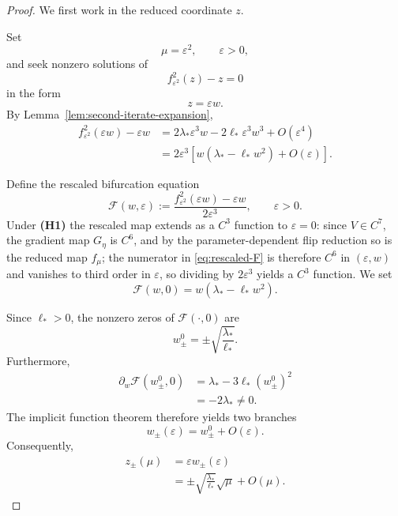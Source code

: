 \begin{proof}
We first work in the reduced coordinate $z$.

Set
\[
\mu=\varepsilon^2,
\qquad
\varepsilon>0,
\]
and seek nonzero solutions of
\[
f_{\varepsilon^2}^2(z)-z=0
\]
in the form
\[
z=\varepsilon w.
\]
By Lemma~\ref{lem:second-iterate-expansion},
\begin{align}
f_{\varepsilon^2}^2(\varepsilon w)-\varepsilon w
&=
2\lambda_*\varepsilon^3w
-
2\ell_*\varepsilon^3w^3
+
O(\varepsilon^4)
\nonumber\\
&=
2\varepsilon^3
\left[
w(\lambda_*-\ell_*w^2)
+
O(\varepsilon)
\right].
\label{eq:scaled-second-iterate}
\end{align}

Define the rescaled bifurcation equation
\begin{equation}
\mathscr F(w,\varepsilon)
:=
\frac{
f_{\varepsilon^2}^2(\varepsilon w)-\varepsilon w
}{
2\varepsilon^3
},
\qquad
\varepsilon>0.
\label{eq:rescaled-F}
\end{equation}
Under \textbf{(H1)} the rescaled map extends as a $C^3$ function to
$\varepsilon=0$: since $V\in C^7$, the gradient map $G_\eta$ is
$C^6$, and by the parameter-dependent flip reduction so is the
reduced map $f_\mu$; the numerator in \eqref{eq:rescaled-F} is
therefore $C^6$ in $(\varepsilon,w)$ and vanishes to third order in
$\varepsilon$, so dividing by $2\varepsilon^3$ yields a $C^3$
function.  We set
\begin{equation}
\mathscr F(w,0)
=
w(\lambda_*-\ell_*w^2).
\label{eq:rescaled-limit}
\end{equation}

Since $\ell_*>0$, the nonzero zeros of
$\mathscr F(\cdot,0)$ are
\begin{equation}
w_\pm^0
=
\pm
\sqrt{\frac{\lambda_*}{\ell_*}}.
\label{eq:w0}
\end{equation}
Furthermore,
\begin{align}
\partial_w\mathscr F(w_\pm^0,0)
&=
\lambda_*
-
3\ell_*(w_\pm^0)^2
\nonumber\\
&=
-2\lambda_*
\neq0.
\label{eq:IFT-nondegenerate}
\end{align}
The implicit function theorem therefore yields two branches
\[
w_\pm(\varepsilon)
=
w_\pm^0+O(\varepsilon).
\]
Consequently,
\begin{align}
z_\pm(\mu)
&=
\varepsilon w_\pm(\varepsilon)
\nonumber\\
&=
\pm
\sqrt{\frac{\lambda_*}{\ell_*}}
\sqrt{\mu}
+
O(\mu).
\label{eq:z-period-two}
\end{align}


\end{proof}
